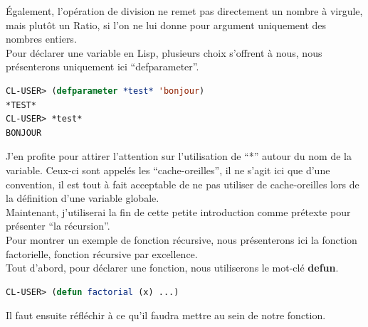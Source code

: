 \documentclass[a4paper, 12pt]{article}
\numberwithin{equation}{subsection}
\begin{document}
Également, l'opération de division ne remet pas directement un nombre à virgule, mais plutôt un Ratio, si l'on ne lui donne pour argument uniquement des nombres entiers. \\

Pour déclarer une variable en Lisp, plusieurs choix s'offrent à nous, nous présenterons uniquement ici ``defparameter''.
\begin{lstlisting}[language=Lisp]
CL-USER> (defparameter *test* 'bonjour)
*TEST*
CL-USER> *test*
BONJOUR
\end{lstlisting}
J'en profite pour attirer l'attention sur l'utilisation de ``*'' autour du nom de la variable. Ceux-ci sont appelés les ``cache-oreilles'', il ne s'agit ici que d'une convention, il est tout à fait acceptable de ne pas utiliser de cache-oreilles lors de la définition d'une variable globale. \\

Maintenant, j'utiliserai la fin de cette petite introduction comme prétexte pour présenter ``la récursion''. \\

Pour montrer un exemple de fonction récursive, nous présenterons ici la fonction factorielle, fonction récursive par excellence. \\

Tout d'abord, pour déclarer une fonction, nous utiliserons le mot-clé {\bf defun}.
\begin{lstlisting}[language=Lisp]
CL-USER> (defun factorial (x) ...)
\end{lstlisting}
Il faut ensuite réfléchir à ce qu'il faudra mettre au sein de notre fonction. \\
\end{document}
